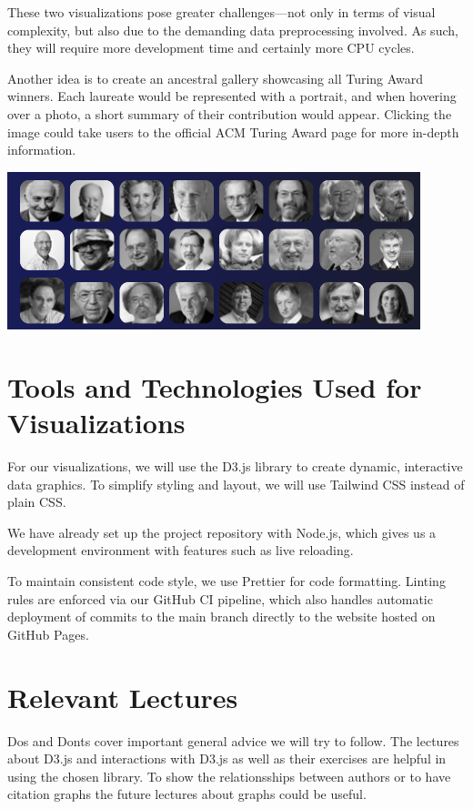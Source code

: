 \documentclass{article}
\begin{document}
These two visualizations pose greater challenges—not only in terms of visual complexity, but also due to the demanding data preprocessing involved.
As such, they will require more development time and certainly more CPU cycles.

Another idea is to create an ancestral gallery showcasing all Turing Award winners.
Each laureate would be represented with a portrait, and when hovering over a photo, a short summary of their contribution would appear.
Clicking the image could take users to the official ACM Turing Award page for more in-depth information.

\begin{center}
\includegraphics[width=0.9\textwidth]{./pictures/ancestor_galery.png}
\end{center}

\section{Tools and Technologies Used for Visualizations}
For our visualizations, we will use the D3.js library to create dynamic, interactive data graphics.
To simplify styling and layout, we will use Tailwind CSS instead of plain CSS.

We have already set up the project repository with Node.js, which gives us a development environment with features such as live reloading.

To maintain consistent code style, we use Prettier for code formatting.
Linting rules are enforced via our GitHub CI pipeline, which also handles automatic deployment of commits to the main branch directly to the website hosted on GitHub Pages.

\section{Relevant Lectures}
Dos and Donts cover important general advice we will try to follow.
The lectures about D3.js and interactions with D3.js as well as their exercises are helpful in using the chosen library.
To show the relationsships between authors or to have citation graphs the future lectures about graphs could be useful.
\end{document}
